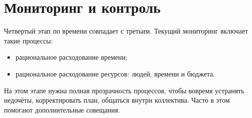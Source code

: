 \section{Мониторинг и контроль}
Четвертый этап по времени совпадает с третьим. Текущий мониторинг включает такие процессы:
\begin{itemize}
	\item рациональное расходование времени; 
	\item рациональное расходование ресурсов: людей, времени и бюджета.
\end{itemize}

На этом этапе нужна полная прозрачность процессов, чтобы вовремя устранять недочёты, корректировать план, общаться внутри коллектива. Часто в этом помогают дополнительные совещания.